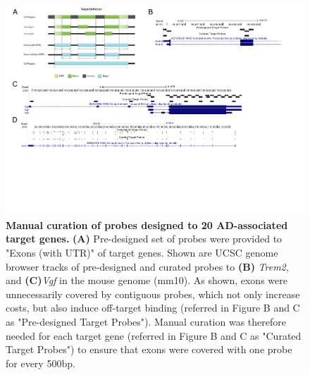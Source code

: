 \begin{landscape}
	\begin{figure}[!ht]
		\begin{center}
			\includegraphics[page=1,trim={0cm 10cm 0cm 0cm},clip,scale = 0.90]{Figures/TargetProbes_Visualisation.pdf}
		\end{center}
		\captionsetup{width=1.5\textwidth}
		\caption[Manual curation of probes designed to 20 AD-associated target genes]%
		{\textbf{Manual curation of probes designed to 20 AD-associated target genes.} \textbf{(A)} Pre-designed set of probes were provided to "Exons (with UTR)" of target genes. Shown are UCSC genome browser tracks of pre-designed and curated probes to \textbf{(B)} \textit{Trem2}, and \textbf{(C)}\textit{Vgf} in the mouse genome (mm10). As shown, exons were unnecessarily covered by contiguous probes, which not only increase costs, but also induce off-target binding (referred in Figure B and C as "Pre-designed Target Probes"). Manual curation was therefore needed for each target gene (referred in Figure B and C as "Curated Target Probes") to ensure that exons were covered with one probe for every 500bp. }
		\label{fig:target_probes_eg}
	\end{figure}
\end{landscape}

